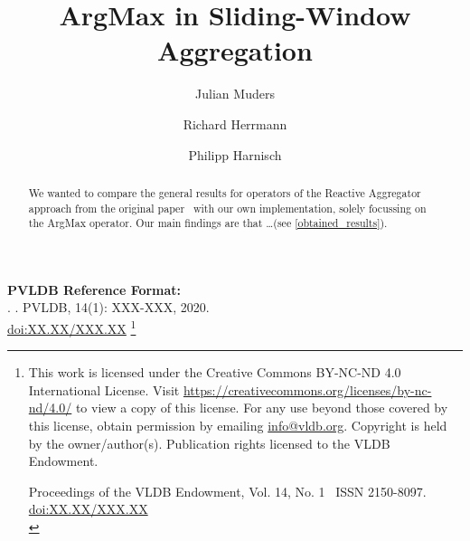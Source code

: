 \documentclass[sigconf, nonacm]{acmart}
\newcommand\vldbdoi{XX.XX/XXX.XX}
\newcommand\vldbpages{XXX-XXX}
\newcommand\vldbvolume{14}
\newcommand\vldbissue{1}
\newcommand\vldbyear{2020}
\newcommand\vldbauthors{\authors}
\newcommand\vldbtitle{\shorttitle}
\newcommand\vldbpagestyle{plain}
\begin{document}
\title{ArgMax in Sliding-Window Aggregation}

\author{Julian Muders}

\author{Richard Herrmann}

\author{Philipp Harnisch}

\begin{abstract}
We wanted to compare the general results for operators of the Reactive Aggregator approach from the original paper~\cite{GeneralIncremental15}
with our own implementation, solely focussing on the ArgMax operator. Our main findings are that \ldots (see \autoref{obtained_results}).
\end{abstract}

\maketitle

\pagestyle{\vldbpagestyle}
\begingroup\small\noindent\raggedright\textbf{PVLDB Reference Format:}\\
\vldbauthors. \vldbtitle. PVLDB, \vldbvolume(\vldbissue): \vldbpages, \vldbyear.\\
\href{https://doi.org/\vldbdoi}{doi:\vldbdoi}
\endgroup
\begingroup
\renewcommand\thefootnote{}\footnote{\noindent
This work is licensed under the Creative Commons BY-NC-ND 4.0 International License. Visit \url{https://creativecommons.org/licenses/by-nc-nd/4.0/} to view a copy of this license. For any use beyond those covered by this license, obtain permission by emailing \href{mailto:info@vldb.org}{info@vldb.org}. Copyright is held by the owner/author(s). Publication rights licensed to the VLDB Endowment. \\
\raggedright Proceedings of the VLDB Endowment, Vol. \vldbvolume, No. \vldbissue\ %
ISSN 2150-8097. \\
\href{https://doi.org/\vldbdoi}{doi:\vldbdoi} \\
}\addtocounter{footnote}{-1}\endgroup
\end{document}
